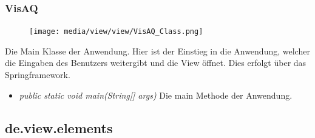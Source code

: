 \subsubsection{VisAQ}
\begin{minipage}{0.3\textwidth}
    \begin{figure}[H]
        \texttt{[image: media/view/view/VisAQ\_Class.png]}
    \end{figure}
    \end{minipage} \hfill
    \begin{minipage}{0.6\textwidth}
Die Main Klasse der Anwendung. Hier ist der Einstieg in die Anwendung, welcher die Eingaben des Benutzers weitergibt und die View öffnet. Dies erfolgt über das Springframework.
\end{minipage}
\begin{itemize} [noitemsep]
    \item \emph{public static void main(String[] args)} Die main Methode der Anwendung.
\end{itemize} 

\subsection{de.view.elements}

